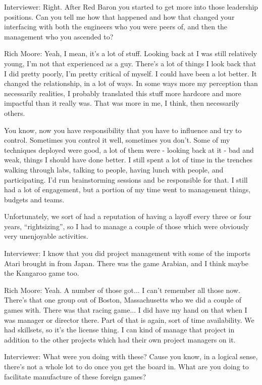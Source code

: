 \textcolor{interviewer}{Interviewer:} Right. After Red Baron you started to get more into those leadership positions. Can you tell me how that happened and how that changed your interfacing with both the engineers who you were peers of, and then the management who you ascended to?

\textcolor{interviewee}{Rich Moore:} Yeah, I mean, it's a lot of stuff. Looking back at I was still relatively young, I'm not that experienced as a guy. There's a lot of things I look back that I did pretty poorly, I’m pretty critical of myself. I could have been a lot better. It changed the relationship, in a lot of ways. In some ways more my perception than necessarily realities, I probably translated this stuff more hardcore and more impactful than it really was. That was more in me, I think, then necessarily others. 

You know, now you have responsibility that you have to influence and try to control. Sometimes you control it well, sometimes you don't. Some of my techniques deployed were good, a lot of them were - looking back at it - bad and weak, things I should have done better. I still spent a lot of time in the trenches walking through labs, talking to people, having lunch with people, and participating. I'd run brainstorming sessions and be responsible for that. I still had a lot of engagement, but a portion of my time went to management things, budgets and teams. 

Unfortunately, we sort of had a reputation of having a layoff every three or four years, “rightsizing”, so I had to manage a couple of those which were obviously very unenjoyable activities.

\textcolor{interviewer}{Interviewer:} I know that you did project management with some of the imports Atari brought in from Japan. There was the game Arabian, and I think maybe the Kangaroo game too.

\textcolor{interviewee}{Rich Moore:} Yeah. A number of those got... I can't remember all those now. There's that one group out of Boston, Massachusetts who we did a couple of games with. There was that racing game... I did have my hand on that when I was manager or director there. Part of that is again, sort of time availability. We had skillsets, so it's the license thing. I can kind of manage that project in addition to the other projects which had their own project managers on it.

\textcolor{interviewer}{Interviewer:} What were you doing with these? Cause you know, in a logical sense, there's not a whole lot to do once you get the board in. What are you doing to facilitate manufacture of these foreign games?

